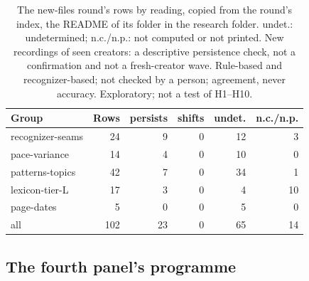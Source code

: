 \begin{table}[tp]
\centering
\footnotesize
\setlength{\tabcolsep}{4pt}
\begin{tabular}{@{}lrrrrr@{}}
\toprule
Group & Rows & persists & shifts & undet. & n.c./n.p. \\
\midrule
recognizer-seams & 24 & 9 & 0 & 12 & 3 \\
pace-variance & 14 & 4 & 0 & 10 & 0 \\
patterns-topics & 42 & 7 & 0 & 34 & 1 \\
lexicon-tier-L & 17 & 3 & 0 & 4 & 10 \\
page-dates & 5 & 0 & 0 & 5 & 0 \\
\midrule
all & 102 & 23 & 0 & 65 & 14 \\
\bottomrule
\end{tabular}
\caption{The new-files round's rows by reading, copied from the round's index, the README of its folder in the research
folder. undet.: undetermined; n.c./n.p.: not computed or not printed. New recordings of seen creators: a descriptive
persistence check, not a confirmation and not a fresh-creator wave. Rule-based and recognizer-based; not checked by a
person; agreement, never accuracy. Exploratory; not a test of H1--H10.}
\label{tab:newfiles}
\end{table}

\subsection{The fourth panel's programme}
\label{app:panel4}


